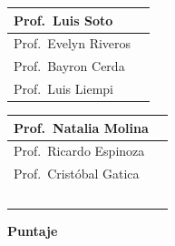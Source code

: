 \documentclass[addpoints,12pt]{exam}
\begin{document}
\vspace{0.15cm}
\noindent
\begin{minipage}{0.49\textwidth}
\begin{tabular}{|l|p{1.1cm}|}
\hline
Prof.\ Luis Soto & \\ \hline
Prof.\ Evelyn Riveros & \\ \hline
Prof.\ Bayron Cerda & \\ \hline
Prof.\ Luis Liempi & \\ \hline
\end{tabular}
\end{minipage}%
\begin{minipage}{0.49\textwidth}
\begin{tabular}{|l|p{1.1cm}|}
\hline
Prof.\ Natalia Molina & \\ \hline
Prof.\ Ricardo Espinoza & \\ \hline
Prof.\ Crist\'obal Gatica & \\ \hline
~ & \\ \hline
\end{tabular}
\end{minipage}

\vspace{0.9cm}
\begin{center}
{\large\textbf{Puntaje}}\\[0.2cm]
\gradetable[v][questions]
\end{center}

\newpage
\end{document}
